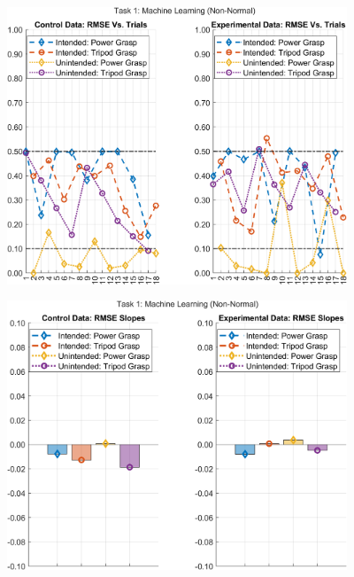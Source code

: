\documentclass[12pt]{article}
\newcommand\figWidth{4in}
\begin{document}
    \begin{figure}
        \includegraphics[width = \figWidth]{t1-rmse-xnorm.png}
    \end{figure}
    \begin{figure}
        \includegraphics[width = \figWidth]{t1-bar-xnorm.png}
    \end{figure}
\end{document}
